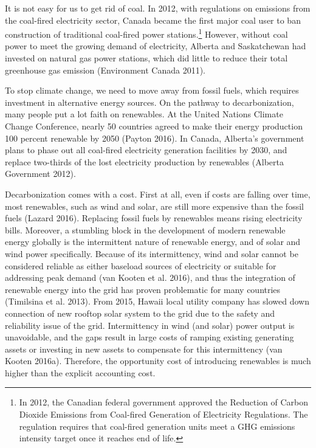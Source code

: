 It is not easy for us to get rid of coal. In 2012, with regulations on
emissions from the coal-fired electricity sector, Canada became the
first major coal user to ban construction of traditional coal-fired
power stations.\footnote{In 2012, the Canadian federal government
  approved the Reduction of Carbon Dioxide Emissions from Coal-fired
  Generation of Electricity Regulations. The regulation requires that
  coal-fired generation units meet a GHG emissions intensity target once
  it reaches end of life.} However, without coal power to meet the
growing demand of electricity, Alberta and Saskatchewan had invested on
natural gas power stations, which did little to reduce their total
greenhouse gas emission (Environment Canada 2011).

To stop climate change, we need to move away from fossil fuels, which
requires investment in alternative energy sources. On the pathway to
decarbonization, many people put a lot faith on renewables. At the
United Nations Climate Change Conference, nearly 50 countries agreed to
make their energy production 100 percent renewable by 2050 (Payton
2016). In Canada, Alberta's government plans to phase out all coal-fired
electricity generation facilities by 2030, and replace two-thirds of the
lost electricity production by renewables (Alberta Government 2012).

Decarbonization comes with a cost. First at all, even if costs are
falling over time, most renewables, such as wind and solar, are still
more expensive than the fossil fuels (Lazard 2016). Replacing fossil
fuels by renewables means rising electricity bills. Moreover, a
stumbling block in the development of modern renewable energy globally
is the intermittent nature of renewable energy, and of solar and wind
power specifically. Because of its intermittency, wind and solar cannot
be considered reliable as either baseload sources of electricity or
suitable for addressing peak demand (van Kooten et al. 2016), and thus
the integration of renewable energy into the grid has proven problematic
for many countries (Timilsina et al. 2013). From 2015, Hawaii local
utility company has slowed down connection of new rooftop solar system
to the grid due to the safety and reliability issue of the grid.
Intermittency in wind (and solar) power output is unavoidable, and the
gaps result in large costs of ramping existing generating assets or
investing in new assets to compensate for this intermittency (van Kooten
2016a). Therefore, the opportunity cost of introducing renewables is
much higher than the explicit accounting cost.

